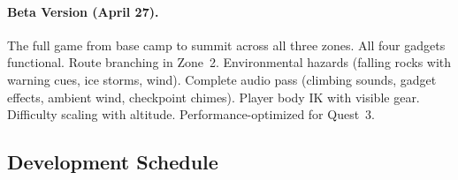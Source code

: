 \documentclass[12pt]{article}
\begin{document}
\paragraph{Beta Version (April 27).}
The full game from base camp to summit across all three zones. All four gadgets functional. Route branching in Zone~2. Environmental hazards (falling rocks with warning cues, ice storms, wind). Complete audio pass (climbing sounds, gadget effects, ambient wind, checkpoint chimes). Player body IK with visible gear. Difficulty scaling with altitude. Performance-optimized for Quest~3.

\subsection{Development Schedule}

\end{document}
